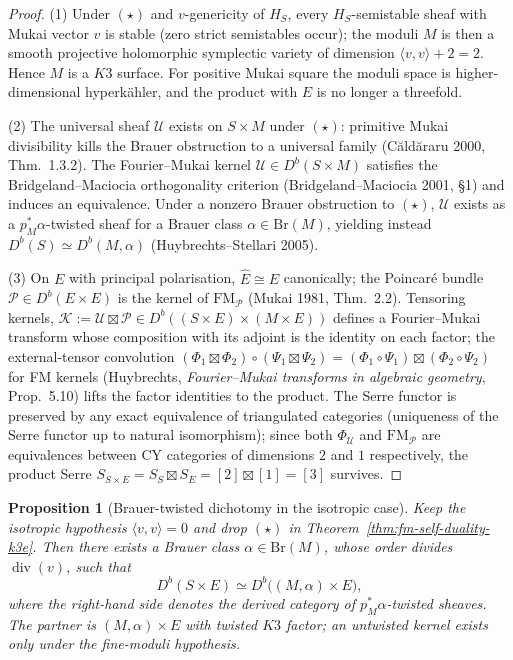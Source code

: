 \documentclass[12pt]{amsart}
\newtheorem{prop}[thm]{Proposition}
\theoremstyle{remark}
\begin{document}
\begin{proof}
  (1) Under $(\star)$ and $v$-genericity of $H_S$, every
  $H_S$-semistable sheaf with Mukai vector $v$ is stable
  (zero strict semistables occur); the moduli $M$ is then a smooth projective
  holomorphic symplectic variety of dimension
  \(\langle v,v\rangle+2=2\).  Hence \(M\) is a \(K3\) surface.  For
	  positive Mukai square the moduli space is higher-dimensional
	  hyperk\"ahler, and the product with \(E\) is no longer a threefold.

	  (2) The universal sheaf $\mathcal{U}$ exists on $S \times M$ under
	  $(\star)$: primitive Mukai divisibility kills the Brauer obstruction
	  to a universal family (C\u{a}ld\u{a}raru 2000,
  Thm.\ 1.3.2). The Fourier--Mukai kernel
  $\mathcal{U} \in D^b(S \times M)$ satisfies the
  Bridgeland--Maciocia orthogonality criterion
  (Bridgeland--Maciocia 2001, \S 1) and induces an equivalence.
  Under a nonzero Brauer obstruction to $(\star)$, $\mathcal{U}$ exists as a
  $p_M^*\alpha$-twisted sheaf for a Brauer class $\alpha \in
  \mathrm{Br}(M)$, yielding instead $D^b(S) \simeq D^b(M, \alpha)$
  (Huybrechts--Stellari 2005).

  (3) On $E$ with principal polarisation, $\hat{E} \cong E$
  canonically; the Poincar\'e bundle $\mathcal{P} \in D^b(E \times E)$
  is the kernel of $\mathrm{FM}_{\mathcal{P}}$ (Mukai 1981, Thm.\
  2.2). Tensoring kernels,
  $\mathcal{K} := \mathcal{U} \boxtimes \mathcal{P} \in D^b((S \times
  E) \times (M \times E))$ defines a Fourier--Mukai transform whose
  composition with its adjoint is the identity on each factor; the
  external-tensor convolution
  \((\Phi_1\boxtimes\Phi_2)\circ(\Psi_1\boxtimes\Psi_2)
  = (\Phi_1\circ\Psi_1)\boxtimes(\Phi_2\circ\Psi_2)\)
  for FM kernels (Huybrechts, \emph{Fourier--Mukai transforms in
  algebraic geometry}, Prop.\ 5.10) lifts the factor identities to the
  product.  The Serre functor is preserved by any exact equivalence of
  triangulated categories (uniqueness of the Serre functor up to natural
  isomorphism); since both \(\Phi_{\mathcal U}\) and
  \(\mathrm{FM}_{\mathcal P}\) are equivalences between CY categories
  of dimensions \(2\) and \(1\) respectively, the product Serre
  \(S_{S\times E}=S_S\boxtimes S_E=[2]\boxtimes[1]=[3]\) survives.
\end{proof}

\begin{prop}[Brauer-twisted dichotomy in the isotropic case]
  \label{prop:coprimality-dichotomy}
  Keep the isotropic hypothesis \(\langle v,v\rangle=0\) and drop
  $(\star)$ in Theorem~\ref{thm:fm-self-duality-k3e}. Then there
  exists a Brauer class $\alpha \in \mathrm{Br}(M)$, whose order
  divides \(\operatorname{div}(v)\), such that
  $$D^b(S \times E) \simeq D^b\bigl((M, \alpha) \times E\bigr),$$
  where the right-hand side denotes the derived category of
  $p_M^*\alpha$-twisted sheaves. The partner is
  \((M,\alpha)\times E\) with twisted \(K3\) factor; an untwisted
	  kernel exists only under the fine-moduli hypothesis.
\end{prop}
\end{document}
